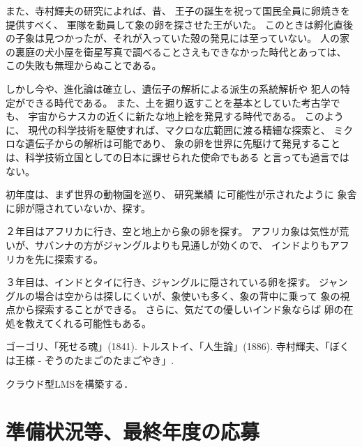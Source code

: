 \documentclass[11pt,a4paper,twoside]{jarticle}
\newcommand{\研究種別}{A}	%
\newcommand{\研究課題名}{コ・クリエイティブなソフトウェア開発者を育成するPBL型教育}
\newcommand{\研究機関名}{産業技術大学院大学}
\newcommand{\研究代表者氏名}{中鉢　欣秀}
\newcommand{\研究代表者氏名ふりがな}{ちゅうばち　よしひで}
\newcommand{\本応募effort}{\KLEffort{18}}	%
\newcommand{\研究期間の最終元号年度}{27}	%
\begin{document}
{	また、寺村輝夫の研究\cite{teramura}によれば、昔、
	王子の誕生を祝って国民全員に卵焼きを提供すべく、
	軍隊を動員して象の卵を探させた王がいた。
	このときは孵化直後の子象は見つかったが、それが入っていた殻の発見には至っていない。
	人の家の裏庭の犬小屋を衛星写真で調べることさえもできなかった時代とあっては、
	この失敗も無理からぬことである。
	
	しかし今や、進化論は確立し、遺伝子の解析による派生の系統解析や
	犯人の特定ができる時代である。
	また、土を掘り返すことを基本としていた考古学でも、
	宇宙からナスカの近くに新たな地上絵を発見する時代である。
	このように、
	現代の科学技術を駆使すれば、マクロな広範囲に渡る精細な探索と、
	ミクロな遺伝子からの解析は可能であり、
	象の卵を世界に先駆けて発見することは、科学技術立国としての日本に課せられた使命でもある
	と言っても過言ではない。

	初年度は、まず世界の動物園を巡り、
	研究業績 に可能性が示されたように
	象舍に卵が隠されていないか、探す。

	２年目はアフリカに行き、空と地上から象の卵を探す。
	アフリカ象は気性が荒いが、サバンナの方がジャングルよりも見通しが効くので、
	インドよりもアフリカを先に探索する。

	３年目は、インドとタイに行き、ジャングルに隠されている卵を探す。
	ジャングルの場合は空からは探しにくいが、象使いも多く、象の背中に乗って
	象の視点から探索することができる。
	さらに、気だての優しいインド象ならば
	卵の在処を教えてくれる可能性もある。
	
	\vspace{1cm}
	\begin{thebibliography}{99}
		 ゴーゴリ、「死せる魂」(1841).
		 トルストイ、「人生論」(1886).
		 寺村輝夫、「ぼくは王様 - ぞうのたまごのたまごやき」.
	\end{thebibliography}
	
	クラウド型LMSを構築する．
}

\section{準備状況等、最終年度の応募}
\end{document}
